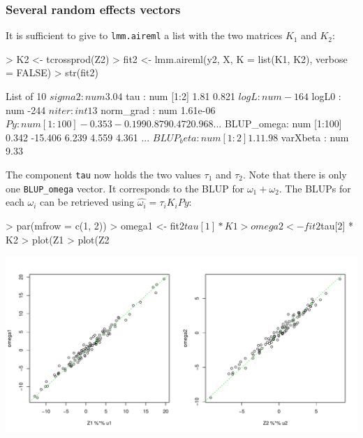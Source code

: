 \documentclass{article}
\renewenvironment{Schunk}{\vspace{\topsep}}{\vspace{\topsep}}
\begin{document}
  \subsubsection{Several random effects vectors}

  It is sufficient to give to \verb!lmm.aireml! a list with the two matrices
  $K_1$ and $K_2$:

\begin{Schunk}
\begin{Sinput}
> K2 <- tcrossprod(Z2)
> fit2 <- lmm.aireml(y2, X, K = list(K1, K2), verbose = FALSE)
> str(fit2)
\end{Sinput}
\begin{Soutput}
List of 10
 $ sigma2    : num 3.04
 $ tau       : num [1:2] 1.81 0.821
 $ logL      : num -164
 $ logL0     : num -244
 $ niter     : int 13
 $ norm_grad : num 1.61e-06
 $ Py        : num [1:100] -0.353 -0.199 0.879 0.472 0.968 ...
 $ BLUP_omega: num [1:100] 0.342 -15.406 6.239 4.559 4.361 ...
 $ BLUP_beta : num [1:2] 1.1 1.98
 $ varXbeta  : num 9.33
\end{Soutput}
\end{Schunk}

  The component \verb!tau! now holds the two values $\tau_1$ and $\tau_2$.
  Note that there is only one \verb!BLUP_omega! vector. It corresponds to
  the BLUP for $\omega_1 + \omega_2$. The BLUPs for each $\omega_i$ can
  be retrieved using $\widehat{\omega_i} = \tau_i K_i Py$:

\begin{center}
\begin{Schunk}
\begin{Sinput}
> par(mfrow = c(1, 2))
> omega1 <- fit2$tau[1] * K1 %
> omega2 <- fit2$tau[2] * K2 %
> plot(Z1 %
> plot(Z2 %
\end{Sinput}
\end{Schunk}
\includegraphics{gaston-045}
\end{center}
\end{document}
